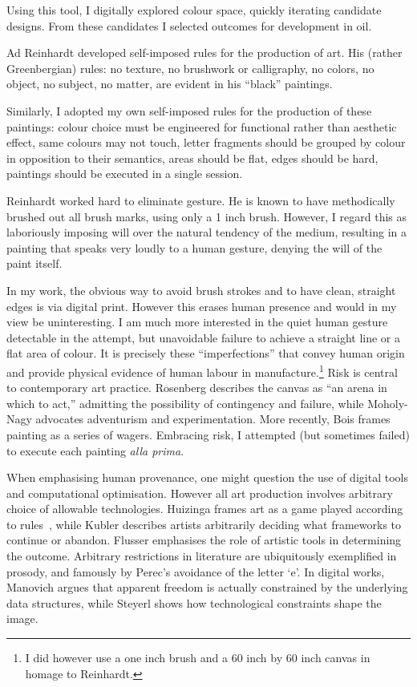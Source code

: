 \documentclass[12pt]{article}
\begin{document}
Using this tool, I digitally explored colour space, quickly iterating
candidate designs. From these candidates I selected outcomes for
development in oil.

Ad Reinhardt developed self-imposed rules for the production of
art.\cite[p. 203-7]{artasart} His (rather Greenbergian) rules: no
texture, no brushwork or calligraphy, no colors, no object, no
subject, no matter, are evident in his ``black'' paintings.

Similarly, I adopted my own self-imposed rules for the production of
these paintings: colour choice must be engineered for functional
rather than aesthetic effect, same colours may not touch, letter
fragments should be grouped by colour in opposition to their
semantics, areas should be flat, edges should be hard, paintings
should be executed in a single session.

Reinhardt worked hard to eliminate gesture. He is known to have
methodically brushed out all brush marks, using only a 1 inch
brush.\cite[p. 206]{artasart} However, I regard this as 
laboriously imposing will over the natural tendency of the medium,
resulting in a painting that speaks very loudly to a human gesture,
denying the will of the paint itself.

In my work, the obvious way to avoid brush strokes and to have clean,
straight edges is via digital print. However this erases human
presence and would in my view be uninteresting. I am much more
interested in the quiet human gesture detectable in the attempt, but
unavoidable failure to achieve a straight line or a flat area of
colour. It is precisely these ``imperfections'' that convey human
origin and provide physical evidence of human labour in
manufacture.\footnote{I did however use a one inch brush and a 60 inch
  by 60 inch canvas in homage to Reinhardt.} Risk is central to
contemporary art practice. Rosenberg describes the canvas as ``an
arena in which to act,''\cite[p. 22]{rosenberg1952american} admitting
the possibility of contingency and failure, while Moholy-Nagy
advocates adventurism and
experimentation\cite[p. 274-6]{moholy1947vision}. More recently, Bois
frames painting as a series of wagers.\cite[p. 229]{bois1990painting}
Embracing risk, I attempted (but sometimes failed) to execute each
painting \emph{alla prima}.

When emphasising human provenance, one might question the use of
digital tools and computational optimisation. However all art
production involves arbitrary choice of allowable
technologies. Huizinga frames art as a game played according to
rules~\cite{huizinga1938homo}, while Kubler describes artists
arbitrarily deciding what frameworks to continue or
abandon.\cite{kubler1962shape} Flusser emphasises the role of artistic
tools in determining the outcome.\cite{flusser2000towards} Arbitrary
restrictions in literature are ubiquitously exemplified in prosody,
and famously by Perec's avoidance of the letter
`e'.\cite{perec1969disparition} In digital works, Manovich argues that apparent freedom is actually constrained by the underlying data structures\cite{manovich2001language}, while Steyerl shows how technological constraints shape the image\cite{steyerl2009poorimage}.
\end{document}
